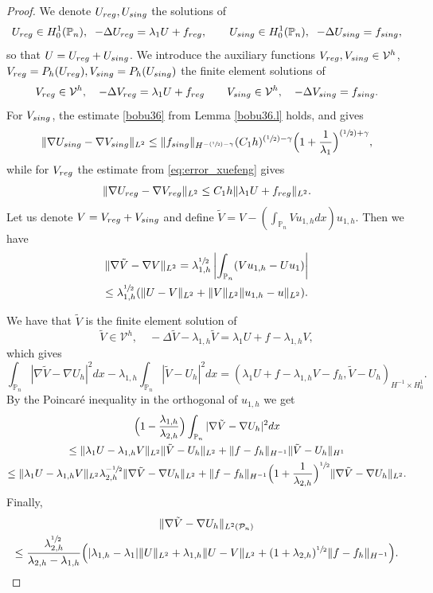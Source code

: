 \documentclass[11pt]{article}
\numberwithin{equation}{section}\newtheorem*{jepEnonce}{\jepEnonceTitle}\newenvironment{enonce*}[1]{\def\jepEnonceTitle{#1}\jepEnonce}{\endjepEnonce}\newtheorem*{conj*}{Conjecture}
\newcommand{\Psfrac}[2]{(\sfrac{#1}{#2})}
\theoremstyle{plain}
\theoremstyle{definition}
\newcommand{\reg}{\textup{reg}}
\newcommand{\sing}{\textup{sing}}
\def\Pp{{\mathbb{P}_n}}
\newcommand{\lb}{\lambda}
\let\jepOriginalSfrac\sfrac
\renewcommand{\sfrac}[2]{{\jepOriginalSfrac{#1}{#2}}}
\begin{document}
\begin{proof}
We denote $U_{\reg}, U_{\sing}$ the solutions of
\[
U_{\reg} \in H^1_0(\Pp), \;\; -\Delta U_{\reg}= \lb_1 U+ f_{\reg}, \qquad U_{\sing}\in H^1_0(\Pp),\;\; -\Delta U_{\sing} = f_{\sing},
\]
so that $U=U_{\reg}+U_{\sing}$. We introduce the auxiliary functions
$V_{\reg}, V_{\sing} \in \mathcal V^h$, $V_{\reg}=P_h(U_{\reg}), V_{\sing}=P_h(U_{\sing})$ the finite element solutions of
\[
V_{\reg}\in \mathcal V^h, \quad -\Delta V_{\reg} = \lb_1 U +f_{\reg} \qquad V_{\sing} \in \mathcal V^h, \quad -\Delta V_{\sing}= f_{\sing}.
\]
For $V_{\sing}$, the estimate \eqref{bobu36} from Lemma \ref{bobu36.l} holds, and gives
\[
\|\nabla U_{\sing}-\nabla V_{\sing}\|_{L^2} \le \|f_{\sing}\|_{H^{-\Psfrac 12 -\gamma}} (C_1 h)^{\Psfrac 12 -\gamma}\Bigl(1+\frac {1}{\lambda_1}\Bigr)^{\Psfrac 12 +\gamma},
\]
while for $V_{\reg}$ the estimate from \eqref{eq:error_xuefeng} gives
\[
\|\nabla U_{\reg}- \nabla V_{\reg} \|_{L^2} \le C_1 h \| \lb_1 U+ f_{\reg}\|_{L^2}.
\]
Let us denote $V=V_{\reg}+V_{\sing}$ and define $\tilde V= V-(\int_{\Pp} Vu_{1,h} dx) u_{1,h}$. Then we have
\vspace*{-5pt}
\begin{multline}\label{bobu80}
\|\nabla \tilde V-\nabla V\|_{L^2} = \lambda_{1,h}^{\sfrac{1}{2}}
\left|\int_{\Pp} (Vu_{1,h} -Uu_1) \right|\\
\leq \lambda_{1,h}^{\sfrac{1}{2}}(\|U-V\|_{L^2}+\|V\|_{L^2}\|u_{1,h}-u\|_{L^2}).
\end{multline}

We have that $\tilde V$ is the finite element solution of
\[
\tilde V \in \mathcal V^h, \quad -\Delta \tilde V-\lb_{1,h} \tilde V= \lb_1 U +f- \lb_{1,h} V,
\]
which gives
\[
\int_{\Pp} |\nabla \tilde V -\nabla U_h|^2 dx - \lb_{1,h}\int_{\Pp} | \tilde V -U_h|^2 dx= (\lb_1 U +f- \lb_{1,h} V-f_h, \tilde V-U_h)_{H^{-1}\times H^1_0}.
\]
By the Poincaré inequality in the orthogonal of $u_{1,h}$ we get
\vspace*{-5pt}
\begin{multline*}
\Bigl(1- \frac{\lb_{1,h}}{\lb_{2,h}} \Bigr) \int_{\Pp} |\nabla \tilde V -\nabla U_h|^2 dx \\
\le \|\lb_1 U-\lb_{1,h} V\|_{L^2}\| \tilde V-U_h\|_{L^2}+ \|f-f_h\|_{H^{-1}} \| \tilde V - U_h\|_{H^1}\\
\le \|\lb_1 U-\lb_{1,h} V\|_{L^2} \lambda_{2,h}^{-\sfrac{1}{2}} \| \nabla \tilde V-\nabla U_h\|_{L^2}+ \|f-f_h\|_{H^{-1}}\Bigl(1+\frac{1}{\lb_{2,h}}\Bigr)^{\sfrac 12} \| \nabla \tilde V-\nabla U_h\|_{L^2}.
\end{multline*}
Finally,
\vspace*{-5pt}
\begin{multline}\label{bobu81}
\| \nabla \tilde V-\nabla U_h\|_{L^2(\mathcal P_n)}\\
\le \frac{\lb_{2,h}^{\sfrac 12}}{\lb_{2,h}-\lb_{1,h}} \Big (|\lb_{1,h}-\lb_1| \|U\|_{L^2} + \lb_{1,h}\|U-V\|_{L^2}+ (1+ \lb_{2,h})^{\sfrac 12}\|f-f_h\|_{H^{-1}}\Big).\qedhere
\end{multline}
\end{proof}
\end{document}
